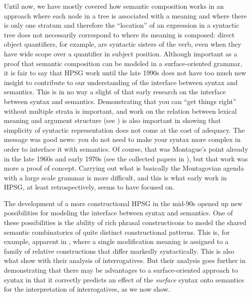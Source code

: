 \documentclass[output=paper]{langsci/langscibook}
\begin{document}
Until now, we have mostly covered how semantic composition works in an approach where each node in a tree is associated with a meaning and where there is only one stratum and therefore the ``location'' of an expression in a syntactic tree does not necessarily correspond to where its meaning is composed: direct object quantifiers, for example, are syntactic sisters of the verb, even when they have wide scope over a quantifier in subject position. Although important as a proof that semantic composition can be modeled in a surface-oriented grammar, it is fair to say that HPSG work until the late 1990s does not have too much new insight to contribute to our understanding of the interface between syntax and semantics. This is in no way a slight of that early research on the interface between syntax and semantics. Demonstrating that you can ``get things right'' without multiple strata is important, and work on the relation between lexical meaning and argument structure (see ) is also important in showing that simplicity of syntactic representation does not come at the cost of adequacy. The message was good news: you do not need to make your syntax more complex in order to interface it with semantics. Of course, that was Montague's point already in the late 1960s and early 1970s (see the collected papers in \citealt{Montague1974}), but that work was more a proof of concept.  Carrying out what is basically the Montagovian agenda with a large scale grammar is more difficult, and this is what early work in HPSG, at least retrospectively, seems to have focused on.

The development of a more constructional HPSG in the mid-90s opened up new possibilities for modeling the interface between syntax and semantics. One of these possibilities is the ability of rich phrasal constructicons to model the shared semantic combinatorics of quite distinct constructional patterns. This is, for example, apparent in \citet{Sag1997}, where a single modification meaning is assigned to a family of relative constructions that differ markedly syntactically. This is also what \citet{GinzburgandSag2001} show with their analysis of interrogatives. But their analysis goes further in demonstrating that there may be advantages to a surface-oriented approach to syntax in that it correctly predicts an effect of the \emph{surface} syntax onto semantics for the interpretation of interrogatives, as we now show. 
\end{document}
